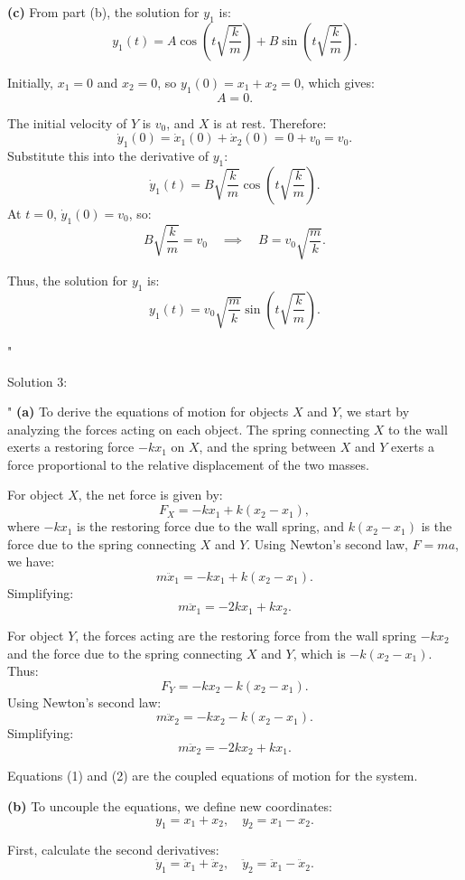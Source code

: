 \textbf{(c)} From part (b), the solution for $y_1$ is:
\[
y_1(t) = A \cos\left(t \sqrt{\frac{k}{m}}\right) + B \sin\left(t \sqrt{\frac{k}{m}}\right).
\]

Initially, $x_1 = 0$ and $x_2 = 0$, so $y_1(0) = x_1 + x_2 = 0$, which gives:
\[
A = 0.
\]

The initial velocity of $Y$ is $v_0$, and $X$ is at rest. Therefore:
\[
\dot{y}_1(0) = \dot{x}_1(0) + \dot{x}_2(0) = 0 + v_0 = v_0.
\]
Substitute this into the derivative of $y_1$:
\[
\dot{y}_1(t) = B \sqrt{\frac{k}{m}} \cos\left(t \sqrt{\frac{k}{m}}\right).
\]
At $t = 0$, $\dot{y}_1(0) = v_0$, so:
\[
B \sqrt{\frac{k}{m}} = v_0 \quad \implies \quad B = v_0 \sqrt{\frac{m}{k}}.
\]

Thus, the solution for $y_1$ is:
\[
\boxed{y_1(t) = v_0 \sqrt{\frac{m}{k}} \sin\left(t \sqrt{\frac{k}{m}}\right).}
\]

"

Solution 3:

"
\textbf{(a)} To derive the equations of motion for objects $X$ and $Y$, we start by analyzing the forces acting on each object. The spring connecting $X$ to the wall exerts a restoring force $-kx_1$ on $X$, and the spring between $X$ and $Y$ exerts a force proportional to the relative displacement of the two masses. 

For object $X$, the net force is given by:
\[
F_X = -kx_1 + k(x_2 - x_1),
\]
where $-kx_1$ is the restoring force due to the wall spring, and $k(x_2 - x_1)$ is the force due to the spring connecting $X$ and $Y$. Using Newton's second law, $F = ma$, we have:
\[
m\ddot{x}_1 = -kx_1 + k(x_2 - x_1).
\]
Simplifying:
\[
m\ddot{x}_1 = -2kx_1 + kx_2. \tag{1}
\]

For object $Y$, the forces acting are the restoring force from the wall spring $-kx_2$ and the force due to the spring connecting $X$ and $Y$, which is $-k(x_2 - x_1)$. Thus:
\[
F_Y = -kx_2 - k(x_2 - x_1).
\]
Using Newton's second law:
\[
m\ddot{x}_2 = -kx_2 - k(x_2 - x_1).
\]
Simplifying:
\[
m\ddot{x}_2 = -2kx_2 + kx_1. \tag{2}
\]

Equations (1) and (2) are the coupled equations of motion for the system.

\vspace{0.5cm}

\textbf{(b)} To uncouple the equations, we define new coordinates:
\[
y_1 = x_1 + x_2, \quad y_2 = x_1 - x_2.
\]

First, calculate the second derivatives:
\[
\ddot{y}_1 = \ddot{x}_1 + \ddot{x}_2, \quad \ddot{y}_2 = \ddot{x}_1 - \ddot{x}_2.
\]

